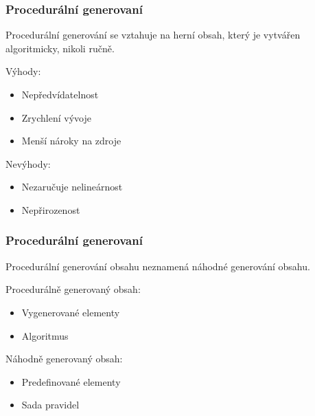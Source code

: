 \documentclass{beamer}
\begin{document}
\begin{frame}
\frametitle{Procedurální generovaní}
Procedurální generování se vztahuje na herní obsah, který je vytvářen algoritmicky, nikoli ručně.
	\begin{multicols}{2}
		Výhody:
  		\begin{itemize}
  			\item Nepředvídatelnost
 			\item Zrychlení vývoje
			\item Menší nároky na zdroje 
		\end{itemize}
		Nevýhody:
		\begin{itemize}
 			\item Nezaručuje nelineárnost
 			\item Nepřirozenost
		\end{itemize}
	\end{multicols}		
\end{frame}	

\begin{frame}	
	\frametitle{Procedurální generovaní}
	Procedurální generování obsahu neznamená náhodné generování obsahu.	
	\begin{multicols}{2}
		Procedurálně generovaný obsah:
  		\begin{itemize}
 			\item Vygenerované elementy
			\item Algoritmus 
		\end{itemize}
		Náhodně generovaný obsah:
		\begin{itemize}
 			\item Predefinované elementy
 			\item Sada pravidel
		\end{itemize}
	\end{multicols}		
\end{frame}
	
\end{document}
